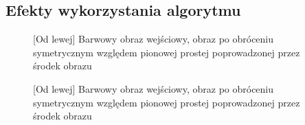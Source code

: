 \documentclass[a4paper,12pt, titlepage]{report}
\begin{document}
\subsection*{Efekty wykorzystania algorytmu}
\begin{figure}[h]
    \centering
    \caption{[Od lewej] Barwowy obraz wejściowy, obraz po obróceniu symetrycznym względem pionowej prostej poprowadzonej przez środek obrazu}%
    \label{fig:geo_after_grey1}%
\end{figure}
\FloatBarrier
\begin{figure}[h]
    \centering
    \caption{[Od lewej] Barwowy obraz wejściowy, obraz po obróceniu symetrycznym względem pionowej prostej poprowadzonej przez środek obrazu}%
    \label{fig:geo_after_grey1}%
\end{figure}
\FloatBarrier
\end{document}

